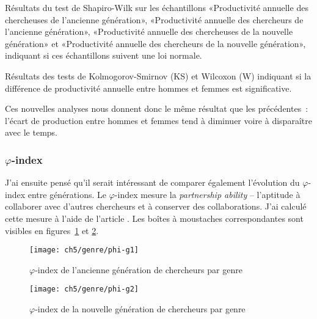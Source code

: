 			\begin{table}[ht]
				\centering
				\caption{Résultats du test de Shapiro-Wilk sur les échantillons «Productivité annuelle des chercheuses de l'ancienne génération», «Productivité annuelle des chercheurs de l'ancienne génération», «Productivité annuelle des chercheuses de la nouvelle génération» et «Productivité annuelle des chercheurs de la nouvelle génération», indiquant si ces échantillons suivent une loi normale.}\label{tab:testsNormBis}
				
			\end{table}
			
			\begin{table}[hb]
				\centering
				\caption{Résultats des tests de Kolmogorov-Smirnov (KS) et Wilcoxon (W) indiquant si la différence de productivité annuelle entre hommes et femmes est significative.}\label{tab:tCompProdBis}
				
			\end{table}
			
			Ces nouvelles analyses nous donnent donc le même résultat que les précédentes~: l'écart de production entre hommes et femmes tend à diminuer voire à disparaître avec le temps.
		
		
		\subsubsection{$\varphi$-index}
			J'ai ensuite pensé qu'il serait intéressant de comparer également l'évolution du $\varphi$-index entre générations. Le $\varphi$-index mesure la \textit{partnership ability} -- l'aptitude à collaborer avec d'autres chercheurs et à conserver des collaborations. J'ai calculé cette mesure à l'aide de l'article \citep{partnership}. Les boîtes à moustaches correspondantes sont visibles en figures~\ref{fig:phi-g1} et \ref{fig:phi-g2}.
			
			\begin{figure}[p]
				\centering
				\texttt{[image: ch5/genre/phi-g1]}
				\caption{$\varphi$-index de l'ancienne génération de chercheurs par genre}\label{fig:phi-g1}
			\end{figure}
			
			\begin{figure}[p]
				\centering
				\texttt{[image: ch5/genre/phi-g2]}
				\caption{$\varphi$-index de la nouvelle génération de chercheurs par genre}\label{fig:phi-g2}
			\end{figure}
			

